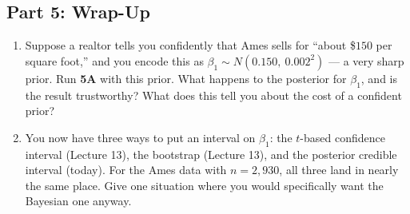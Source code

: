 \documentclass{article}
\begin{document}
\subsection*{Part 5: Wrap-Up}
\begin{enumerate}[label={\bfseries (\Alph*)},itemsep=.6em]
    \item Suppose a realtor tells you confidently that Ames sells for ``about \$$150$ per square foot,'' and you encode this as $\beta_1 \sim N(0.150,\ 0.002^2)$ --- a very sharp prior. Run \textbf{5A} with this prior. What happens to the posterior for $\beta_1$, and is the result trustworthy? What does this tell you about the cost of a confident prior? \\[4.5em]

    \item You now have three ways to put an interval on $\beta_1$: the $t$-based confidence interval (Lecture 13), the bootstrap (Lecture 13), and the posterior credible interval (today). For the Ames data with $n = 2{,}930$, all three land in nearly the same place. Give one situation where you would specifically want the Bayesian one anyway. \\[4.5em]
\end{enumerate}
\end{document}
